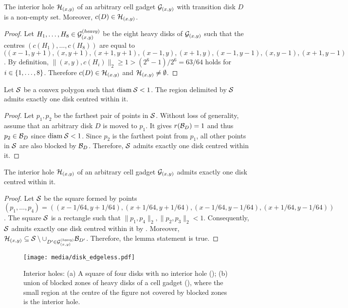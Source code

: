 \begin{toappendix}
\begin{toappendix}
\begin{mlemmarep}\label{lem:holes_in_cell_gadgets}
    The interior hole $\H_{(x,y)}$ of an arbitrary cell gadget $\G_{(x,y)}$ with transition disk $D$ is a non-empty set.
    Moreover, $c(D) \in \H_{(x,y)}$.
\end{mlemmarep}
\begin{proof}
    Let $H_1,\ldots,H_8 \in \G_{(x,y)}^{(\mathit{heavy})}$ be the eight heavy disks of $\G_{(x,y)}$ such that the centres $(c(H_1),\ldots,c(H_8))$ are equal to $ ((x-1,y+1),(x,y+1),(x+1,y+1),(x-1,y),(x+1,y),(x-1,y-1),(x,y-1),(x+1,y-1)$.
    By definition, $\lVert (x,y), c(H_i)\rVert_2 \ge 1 > (2^6-1)/ 2^6 = 63/64$ holds for $i \in \set{1,\ldots,8}$.
    Therefore $c(D) \in \H_{(x,y)}$ and $\H_{(x,y)} \neq \emptyset$.
\end{proof}

\begin{observation}\label{obs:convex_polygon_one_disk}
    Let $\S$ be a convex polygon such that $\diam{\S} < 1$. The region delimited by $\S$ admits exactly one disk centred within it.
\end{observation}
\begin{proof}
    Let $p_1,p_2$ be the farthest pair of points in $\S$.
    Without loss of generality, assume that an arbitrary disk $D$ is moved to $p_1$.
    It gives $r(\B_D) = 1$ and thus $p_2 \in \B_D$ since $\diam{\S} < 1$.
    Since $p_2$ is the farthest point from $p_1$, all other points in $\S$ are also blocked by $\B_D$.
    Therefore, $\S$ admits exactly one disk centred within it.
\end{proof}


\begin{mlemmarep}\label{lem:holes_one_disk}
    The interior hole $\H_{(x,y)}$ of an arbitrary cell gadget $\G_{(x,y)}$ admits exactly one disk centred within it.
\end{mlemmarep}
\begin{proof}
    Let $\S$ be the square formed by points $(p_1,\ldots,p_4) = ((x-1/64,y+1/64),(x+1/64,y+1/64),(x-1/64,y-1/64),(x+1/64,y-1/64))$.
    The square $\S$ is a rectangle such that $\lVert p_1,p_4\rVert_2,\lVert p_2,p_3\rVert_2<1$. Consequently, $\S$ admits exactly one disk centred within it by .
    Moreover, $\H_{(x,y)} \subseteq \S \setminus \cup_{D' \in \G_{(x,y)}^{(\mathit{heavy})}} \B_{D'}$.
    Therefore, the lemma statement is true.
\end{proof}

\begin{figure}[!b]
    \centering
    \texttt{[image: media/disk\_edgeless.pdf]}
    \caption{Interior holes: (a) A square of four disks with no interior hole (); (b) union of blocked zones of heavy disks of a cell gadget (), where the small region at the centre of the figure not covered by blocked zones is the interior hole.}
    \label{fig:interior_holes}
\end{figure}


\end{toappendix}
\end{toappendix}

